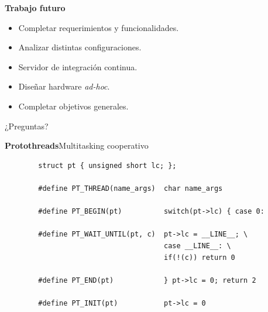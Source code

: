 \documentclass[11pt, xcolor={table,xcdraw}]{beamer}
\begin{document}
\begin{frame}{\textbf{\LARGE{Trabajo futuro}}}
\fontsize{18pt}{18}\selectfont
	\vspace{-.7cm}
	\centering
	\begin{itemize}
	\item Completar requerimientos y funcionalidades.
	\vspace{15px}
	\item Analizar distintas configuraciones.
	\vspace{15px}
	\item Servidor de integración continua.
	\vspace{15px}	
	\item Diseñar hardware \textit{ad-hoc}.
	\vspace{15px}	
	\item Completar objetivos generales.
	\end{itemize}
\end{frame}


\begin{frame}[plain,c]
\begin{center}
\Huge ¿Preguntas?
\end{center}

\end{frame}


\begin{frame}[fragile]{\textbf{\LARGE{Protothreads}}}{Multitasking cooperativo}
	\vspace{-.7cm}
	\begin{verbatim}
		struct pt { unsigned short lc; };
		
		#define PT_THREAD(name_args)  char name_args

		#define PT_BEGIN(pt)          switch(pt->lc) { case 0:

		#define PT_WAIT_UNTIL(pt, c)  pt->lc = __LINE__; \
		                              case __LINE__: \
		                              if(!(c)) return 0

		#define PT_END(pt)            } pt->lc = 0; return 2

		#define PT_INIT(pt)           pt->lc = 0
	\end{verbatim}
\end{frame}
\end{document}
